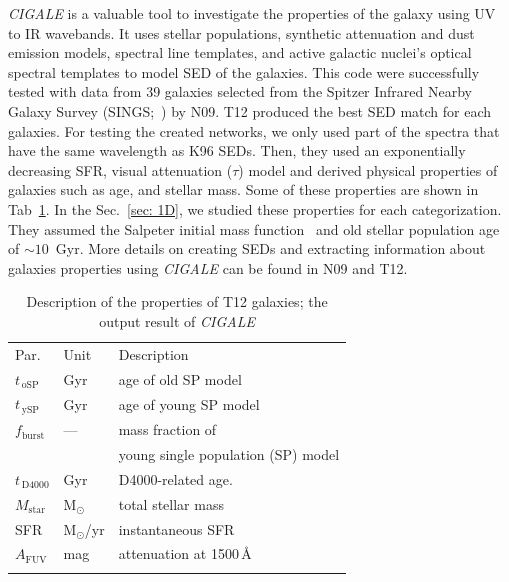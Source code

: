     {\em CIGALE} is a valuable tool to investigate the properties of the galaxy using UV to IR wavebands.
    It uses stellar populations, synthetic attenuation and dust emission models, spectral line templates, and active galactic nuclei's optical spectral templates to model SED of the galaxies.
    This code were successfully tested with data from 39 galaxies selected from the Spitzer Infrared Nearby Galaxy Survey (SINGS;~\citep{Kennicutt03}) by N09.
    T12 produced the best SED match for each galaxies.
    For testing the created networks, we only used part of the spectra that have the same wavelength as K96 SEDs. %
    Then, they used an exponentially decreasing SFR, visual attenuation ($\tau$) model and derived physical properties of galaxies such as age, and stellar mass.
    Some of these properties are shown in Tab~\ref{tab: props}.
    In the Sec.~\ref{sec: 1D}, we studied these properties for each categorization. %
    They assumed the Salpeter initial mass function~\citep{Salpeter55} and old stellar population age of $\sim 10$~Gyr.
    More details on creating SEDs and extracting information about galaxies properties using {\em CIGALE} can be found in N09 and T12.
    
    \begin{table}
\caption[]{Description of the properties of T12 galaxies; the output result of {\em CIGALE}}     
\label{tab: props}
\centering
\begin{tabular}{l l l}
\hline\hline
\noalign{\smallskip}
Par. & Unit & Description\\
\noalign{\smallskip}
\hline
\noalign{\smallskip}
$t_{\,\mathrm{oSP}}$ & Gyr & age of old SP model \\
$t_{\,\mathrm{ySP}}$ & Gyr & age of young SP model \\
$f_\mathrm{burst}$ & --- & mass fraction of \\
& & young single population (SP) model \\
\noalign{\smallskip}
$t_{\,\mathrm{D4000}}$ & Gyr & D4000-related age. \\
\noalign{\smallskip}
$M_\mathrm{star}$ & M$_\odot$ & total stellar mass  \\
SFR & M$_\odot$/yr & instantaneous SFR  \\
$A_\mathrm{FUV}$ & mag & attenuation at 1500\,\AA{} \\
\noalign{\smallskip}
\hline
\end{tabular}
\end{table}
